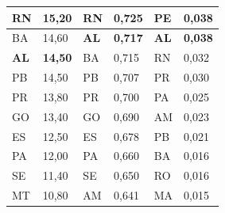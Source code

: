 \begin{table}[H]
\begin{tabular}{|l|l|l|l|l|l|}
		RN                          & 15,20                         & RN                                  & 0,725                                  & PE                                  & 0,038                                  \\ \hline
		BA                          & 14,60                         & \textbf{AL} & \textbf{0,717} & \textbf{AL} & \textbf{0,038} \\ \hline
		\textbf{AL}                 & \textbf{14,50}                & BA                                  & 0,715                                  & RN                                  & 0,032                                  \\ \hline
		PB                          & 14,50                         & PB                                  & 0,707                                  & PR                                  & 0,030                                  \\ \hline
		PR                          & 13,80                         & PR                                  & 0,700                                  & PA                                  & 0,025                                  \\ \hline
		GO                          & 13,40                         & GO                                  & 0,690                                  & AM                                  & 0,023                                  \\ \hline
		ES                          & 12,50                         & ES                                  & 0,678                                  & PB                                  & 0,021                                  \\ \hline
		PA                          & 12,00                         & PA                                  & 0,660                                  & BA                                  & 0,016                                  \\ \hline
		SE                          & 11,40                         & SE                                  & 0,650                                  & RO                                  & 0,016                                  \\ \hline
		MT                          & 10,80                         & AM                                  & 0,641                                  & MA                                  & 0,015                                  \\ \hline

\end{tabular}
\end{table}
